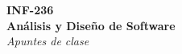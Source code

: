 \thispagestyle{empty}

\begin{center}
  \Huge
  \textbf{INF-236 \\ Análisis y Diseño de Software} \\
  \emph{Apuntes de clase}
\end{center}

\clearpage
